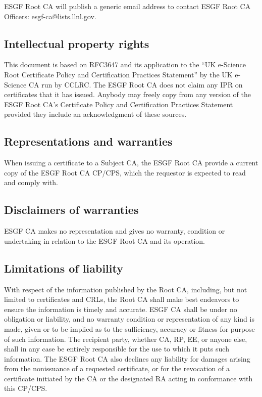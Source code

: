 ESGF Root CA will publish a generic email address to contact
ESGF Root CA Officers: esgf-ca@lists.llnl.gov.

\subsection{Intellectual property rights}\label{intellectual-property-rights}

This document is based on RFC3647 and its application to the ``UK
e-Science Root Certificate Policy and Certification Practices
Statement'' by the UK e-Science CA run by CCLRC. The ESGF Root CA does not claim any IPR on certificates that it has issued. Anybody may
freely copy from any version of the ESGF Root CA's Certificate
Policy and Certification Practices Statement provided they include an
acknowledgment of these sources.

\subsection{Representations and warranties}\label{representations-and-warranties}

When issuing a certificate to a Subject CA, the ESGF Root CA provide a current copy of the ESGF Root CA CP/CPS, which the requestor is expected to read and comply with.

\subsection{Disclaimers of warranties}\label{disclaimers-of-warranties}

ESGF CA makes no representation and gives no warranty, condition or
undertaking in relation to the ESGF Root CA and its operation.

\subsection{Limitations of liability}\label{limitations-of-liability}

With respect of the information published by the Root CA, including, but
not limited to certificates and CRLs, the Root CA shall make best
endeavors to ensure the information is timely and accurate. ESGF CA
shall be under no obligation or liability, and no warranty condition or
representation of any kind is made, given or to be implied as to the
sufficiency, accuracy or fitness for purpose of such information. The
recipient party, whether CA, RP, EE, or anyone else, shall in any case
be entirely responsible for the use to which it puts such information.
The ESGF Root CA also declines any liability for damages arising
from the nonissuance of a requested certificate, or for the revocation
of a certificate initiated by the CA or the designated RA acting in
conformance with this CP/CPS.

